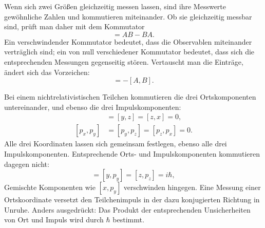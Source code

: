 Wenn sich zwei Größen gleichzeitig messen lassen, sind ihre Messwerte gewöhnliche Zahlen und kommutieren miteinander. Ob sie gleichzeitig messbar sind, prüft man daher mit dem Kommutator
\begin{equation}
[A,B]=AB-BA.
\end{equation}
Ein verschwindender Kommutator bedeutet, dass die Observablen miteinander verträglich sind; ein von null verschiedener Kommutator bedeutet, dass sich die entsprechenden Messungen gegenseitig stören. Vertauscht man die Einträge, ändert sich das Vorzeichen:
\begin{equation}
[B,A]=-[A,B].
\end{equation}

Bei einem nichtrelativistischen Teilchen kommutieren die drei Ortskomponenten untereinander, und ebenso die drei Impulskomponenten:
\begin{align}
[x,y]&=[y,z]=[z,x]=0,\\
[p_x,p_y]&=[p_y,p_z]=[p_z,p_x]=0.
\end{align}
Alle drei Koordinaten lassen sich gemeinsam festlegen, ebenso alle drei Impulskomponenten. Entsprechende Orts- und Impulskomponenten kommutieren dagegen nicht:
\begin{equation}
[x,p_x]=[y,p_y]=[z,p_z]=i\hbar,
\end{equation}
Gemischte Komponenten wie \([x,p_y]\) verschwinden hingegen. Eine Messung einer Ortskoordinate versetzt den Teilchenimpuls in der dazu konjugierten Richtung in Unruhe. Anders ausgedrückt: Das Produkt der entsprechenden Unsicherheiten von Ort und Impuls wird durch \(\hbar\) bestimmt.

\begin{classroomqa}\end{classroomqa}

\begin{classroomqa}\end{classroomqa}

